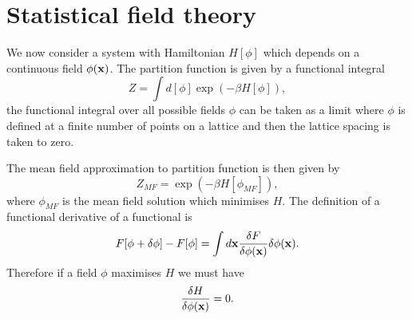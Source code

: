 \documentclass[11pt]{report}
\begin{document}
\section{Statistical field theory}
We now consider a system with Hamiltonian $H[\phi]$ which depends on a continuous field 
$\phi({\bf x})$. The partition function is given by a functional integral
\begin{equation}
Z = \int d[\phi] \exp(-\beta H[\phi]),
\end{equation}
the functional integral over all possible fields $\phi$ can be taken as a limit where $\phi$ is defined at a finite number of points on a lattice and then the lattice spacing is taken to zero. 

The mean field approximation to partition function is then given by
\begin{equation}
Z _{MF}=  \exp(-\beta H[\phi_{MF}]),
\end{equation} 
where $\phi_{MF}$ is the mean field solution which minimises $H$. The definition of a functional derivative of a functional is
\begin{equation}
F[\phi+\delta\phi]-F[\phi]= \int d{\bf x} \frac{\delta F}{\delta\phi({\bf x})} \delta\phi({\bf x}).
\end{equation}
Therefore if a field $\phi$ maximises $H$ we must have 
\begin{equation}
\frac{\delta H}{\delta\phi({\bf x})}=0.
\end{equation}
\end{document}
